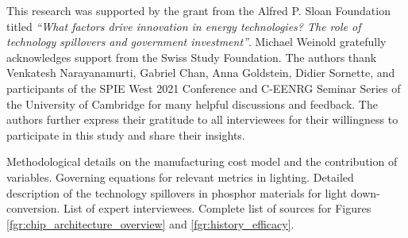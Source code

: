 \documentclass[journal=jacsat,manuscript=article]{achemso}
\begin{document}
\begin{acknowledgement}

This research was supported by the grant from the Alfred P. Sloan Foundation titled \textit{“What factors drive innovation in energy technologies? The role of technology spillovers and government investment”}. Michael Weinold gratefully acknowledges support from the Swiss Study Foundation. The authors thank Venkatesh Narayanamurti, Gabriel Chan, Anna Goldstein, Didier Sornette, and participants of the SPIE West 2021 Conference and C-EENRG Seminar Series of the University of Cambridge for many helpful discussions and feedback. The authors further express their gratitude to all interviewees for their willingness to participate in this study and share their insights. 

\end{acknowledgement}

\begin{suppinfo}

Methodological details on the manufacturing cost model and the contribution of variables. Governing equations for relevant metrics in lighting. Detailed description of the technology spillovers in phosphor materials for light down-conversion. List of expert interviewees. Complete list of sources for Figures \ref{fgr:chip_architecture_overview} and \ref{fgr:history_efficacy}.

\end{suppinfo}


\end{document}

